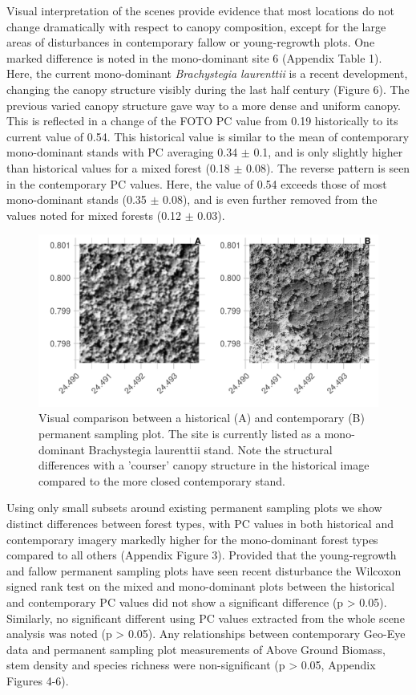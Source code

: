 \documentclass[remote sensing,article,submit,moreauthors,pdftex,10pt,a4paper]{mdpi}
\begin{document}
Visual interpretation of the scenes provide evidence that most locations
do not change dramatically with respect to canopy composition, except
for the large areas of disturbances in contemporary fallow or
young-regrowth plots. One marked difference is noted in the
mono-dominant site 6 (Appendix Table 1). Here, the current mono-dominant
\emph{Brachystegia laurenttii} is a recent development, changing the
canopy structure visibly during the last half century (Figure 6). The
previous varied canopy structure gave way to a more dense and uniform
canopy. This is reflected in a change of the FOTO PC value from 0.19
historically to its current value of 0.54. This historical value is
similar to the mean of contemporary mono-dominant stands with PC
averaging 0.34 \(\pm\) 0.1, and is only slightly higher than historical
values for a mixed forest (0.18 \(\pm\) 0.08). The reverse pattern is
seen in the contemporary PC values. Here, the value of 0.54 exceeds
those of most mono-dominant stands (0.35 \(\pm\) 0.08), and is even
further removed from the values noted for mixed forests (0.12 \(\pm\)
0.03).

\begin{figure}
\includegraphics[width=1\linewidth]{./figures/visual_comparison_psp} \caption{Visual comparison between a historical (A) and contemporary (B) permanent sampling plot. The site is currently listed as a mono-dominant Brachystegia laurenttii stand. Note the structural differences with a 'courser' canopy structure in the historical image compared to the more closed contemporary stand.}\label{fig:unnamed-chunk-8}
\end{figure}

Using only small subsets around existing permanent sampling plots we
show distinct differences between forest types, with PC values in both
historical and contemporary imagery markedly higher for the
mono-dominant forest types compared to all others (Appendix Figure 3).
Provided that the young-regrowth and fallow permanent sampling plots
have seen recent disturbance the Wilcoxon signed rank test on the mixed
and mono-dominant plots between the historical and contemporary PC
values did not show a significant difference (p \textgreater{} 0.05).
Similarly, no significant different using PC values extracted from the
whole scene analysis was noted (p \textgreater{} 0.05). Any
relationships between contemporary Geo-Eye data and permanent sampling
plot measurements of Above Ground Biomass, stem density and species
richness were non-significant (p \textgreater{} 0.05, Appendix Figures
4-6).
\end{document}
